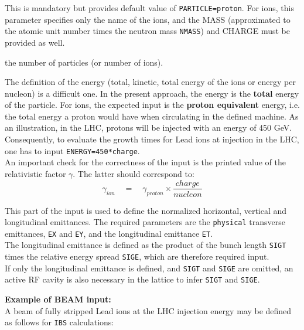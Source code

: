 \begin{madlist}
   This is mandatory but \madx provides default
  value of \texttt{PARTICLE=proton}. For ions, this parameter specifies
  only the name of the ions, and the MASS (approximated to the atomic
  unit number times the neutron mass \texttt{NMASS}) and CHARGE must be
  provided as well.

   the number of particles (or number of ions).

   The definition of the energy (total, kinetic, total
  energy of the ions or energy per nucleon) is a difficult one. In the
  present approach, the energy is the \textbf{total} energy of the
  particle. For ions, the expected input is the \textbf{proton
    equivalent} energy, i.e. the total energy a proton would have when
  circulating in the defined machine. As an illustration, in the LHC,
  protons will be injected with an energy of 450 GeV. Consequently, to
  evaluate the growth times for Lead ions at injection in the LHC, one
  has to input \texttt{ENERGY=450*charge}. \\
  An important check for the correctness of the input is the printed value
  of the relativistic factor  $\gamma$. The latter should correspond to:   
  \[
  \gamma_{ion} \quad = \quad \gamma_{proton} \times \frac{charge}{nucleon}
  \]

   This part of the input is used to define the
  normalized horizontal, vertical and longitudinal emittances. 
  The required parameters are the \texttt{physical} transverse
  emittances, \texttt{EX} and \texttt{EY}, and the longitudinal
  emittance \texttt{ET}.\\  
  The longitudinal emittance is defined  as the product of the bunch
  length \texttt{SIGT} times the relative energy spread \texttt{SIGE},
  which are therefore required input. \\  
  If only the longitudinal emittance is defined, and \texttt{SIGT}
  and \texttt{SIGE} are omitted, an active RF cavity is also
  necessary in the lattice to infer \texttt{SIGT} and \texttt{SIGE}.

\end{madlist}


\textbf{Example of BEAM input:}\\
A beam of fully stripped Lead ions at the LHC injection energy may be
defined as follows for \texttt{IBS} calculations: 


